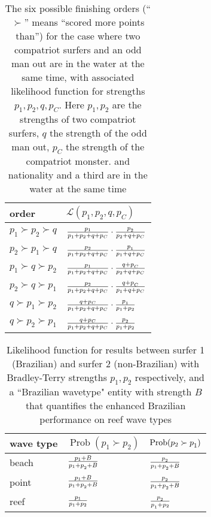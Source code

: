 \documentclass{article}
\begin{document}
\clearpage
\newpage

\begin{table}[h]
\begin{tabular}{l|l}
order  & ${\mathcal L}(p_1,p_2,q,p_C)$\\ \hline
$p_1\succ p_2\succ q $ & $ \frac{p_1}{p_1+p_2+q+p_C}\cdot\frac{p_2^{\vphantom{h}}}{p_2+q+p_C}$\\
$p_2\succ p_1\succ q $ & $ \frac{p_2}{p_1+p_2+q+p_C}\cdot\frac{p_1^{\vphantom{h}}}{p_1+q+p_C}$\\
$p_1\succ q\succ p_2 $ & $ \frac{p_1}{p_1+p_2+q+p_C}\cdot\frac{q+p_C^{\vphantom{h}}}{p_2+q+p_C}$\\
$p_2\succ q\succ p_1 $ & $ \frac{p_2}{p_1+p_2+q+p_C}\cdot\frac{q+p_C^{\vphantom{h}}}{p_1+q+p_C}$\\
$q\succ p_1\succ p_2 $ & $ \frac{q+p_C}{p_1+p_2+q+p_C}\cdot\frac{p_1^{\vphantom{h}}}{p_1+p_2}$\\
$q\succ p_2\succ p_1 $ & $ \frac{q+p_C}{p_1+p_2+q+p_C}\cdot\frac{p_2^{\vphantom{h}}}{p_1+p_2}$\\
\end{tabular}
\caption{The \label{likelihoodcompatriot} six possible finishing
  orders (``$\succ$'' means ``scored more points than'') for the case
  where two compatriot surfers and an odd man out are in the water at
  the same time, with associated likelihood function for strengths
  $p_1,p_2,q, p_C$.  Here $p_1,p_2$ are the strengths of two
  compatriot surfers, $q$ the strength of the odd man out, $p_C$ the
  strength of the compatriot monster. and nationality and a third are
  in the water at the same time}
\end{table}

\clearpage
\newpage

\begin{table}[h]
\begin{tabular}{l|l|l}
wave type  & $\operatorname{Prob}(p_1\succ p_2)$ & $\operatorname{Prob}(p_2\succ p_1^{\vphantom{h}})$\\ \hline
beach & $\frac{p_1+B}{p_1+p_2^{\vphantom{h}}+B}$ & $\frac{p_2^{\vphantom{h}}}{p_1+p_2^{\vphantom{h}}+B}$\\
point & $\frac{p_1+B}{p_1+p_2^{\vphantom{h}}+B}$ & $\frac{p_2^{\vphantom{h}}}{p_1+p_2^{\vphantom{h}}+B}$\\
reef  & $\frac{p_1\vphantom{B}}{p_1+p_2}$ & $\frac{p_2^{\vphantom{h}}}{p_1^{\vphantom{h}}+p_2}$\\
\end{tabular}
\caption{Likelihood function for results between surfer 1 (Brazilian)
  and surfer 2 (non-Brazilian) with \label{probabilitybrazilian} Bradley-Terry
  strengths $p_1,p_2$ respectively, and a ``Brazilian wavetype" entity with
  strength $B$ that quantifies the enhanced Brazilian performance on reef wave types}
\end{table}
\clearpage
\newpage
\end{document}
